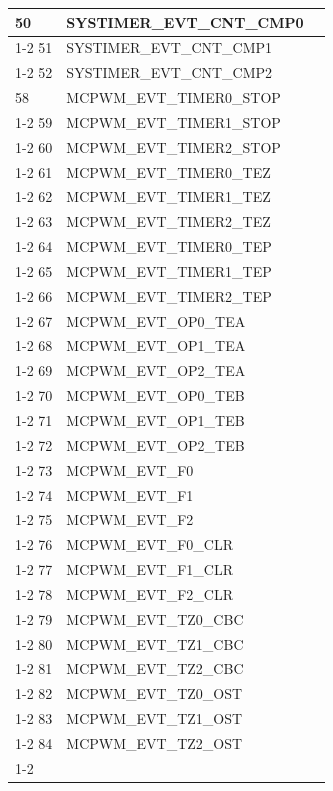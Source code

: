 \documentclass[main\_\_CN.tex]{subfiles}
\begin{document}
\begin{longtable}{ | l | l | l | }
50  & SYSTIMER\_EVT\_CNT\_CMP0  & \nameref{mod:systimer}     \\ \cline{1-2}
51  & SYSTIMER\_EVT\_CNT\_CMP1  & \\ \cline{1-2}
52  & SYSTIMER\_EVT\_CNT\_CMP2  & \\ \hline
58  & MCPWM\_EVT\_TIMER0\_STOP  & \nameref{mod:mcpwm}\\ \cline{1-2}
59  & MCPWM\_EVT\_TIMER1\_STOP  & \\ \cline{1-2}
60  & MCPWM\_EVT\_TIMER2\_STOP  & \\ \cline{1-2}
61  & MCPWM\_EVT\_TIMER0\_TEZ   & \\ \cline{1-2}
62  & MCPWM\_EVT\_TIMER1\_TEZ   & \\ \cline{1-2}
63  & MCPWM\_EVT\_TIMER2\_TEZ   & \\ \cline{1-2}
64  & MCPWM\_EVT\_TIMER0\_TEP   & \\ \cline{1-2}
65  & MCPWM\_EVT\_TIMER1\_TEP   & \\ \cline{1-2}
66  & MCPWM\_EVT\_TIMER2\_TEP   & \\ \cline{1-2}
67  & MCPWM\_EVT\_OP0\_TEA & \\ \cline{1-2}
68  & MCPWM\_EVT\_OP1\_TEA & \\ \cline{1-2}
69  & MCPWM\_EVT\_OP2\_TEA & \\ \cline{1-2}
70  & MCPWM\_EVT\_OP0\_TEB & \\ \cline{1-2}
71  & MCPWM\_EVT\_OP1\_TEB & \\ \cline{1-2}
72  & MCPWM\_EVT\_OP2\_TEB & \\ \cline{1-2}
73  & MCPWM\_EVT\_F0     & \\ \cline{1-2}
74  & MCPWM\_EVT\_F1     & \\ \cline{1-2}
75  & MCPWM\_EVT\_F2     & \\ \cline{1-2}
76  & MCPWM\_EVT\_F0\_CLR  & \\ \cline{1-2}
77  & MCPWM\_EVT\_F1\_CLR  & \\ \cline{1-2}
78  & MCPWM\_EVT\_F2\_CLR  & \\ \cline{1-2}
79  & MCPWM\_EVT\_TZ0\_CBC & \\ \cline{1-2}
80  & MCPWM\_EVT\_TZ1\_CBC & \\ \cline{1-2}
81  & MCPWM\_EVT\_TZ2\_CBC & \\ \cline{1-2}
82  & MCPWM\_EVT\_TZ0\_OST & \\ \cline{1-2}
83  & MCPWM\_EVT\_TZ1\_OST & \\ \cline{1-2}
84  & MCPWM\_EVT\_TZ2\_OST & \\ \cline{1-2}

\end{longtable}
\end{document}
